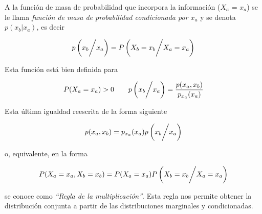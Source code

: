 A la función de masa de probabilidad que incorpora la información ($X_a$ = $x_a$) se le llama \textit{función de masa de probabilidad condicionada por $x_a$}
y se denota $p(x_b|x_a)$, es decir 

\[ p\left( {x_b} \bigg{/} {x_a} \right) = P\left( {X_{b} = x_{b}} \bigg{/} {X_{a} = x_{a}} \right) \]

\newpage

Esta función está bien definida para 

\[ P(X_{a} = x_{a}) > 0 \qquad p\left(x_b \bigg{/} x_a\right) = \frac{p(x_a, x_b)}{p_{x_{a}}(x_a)} \]

Esta última igualdad reescrita de la forma siguiente

\[ p(x_a, x_b) =  p_{x_a}(x_a)p\left( x_b \bigg{/} x_a \right)\]

o, equivalente, en la forma

\[ P(X_a = x_a, X_b = x_b) = P(X_a = x_a)P\left( X_b = x_b \bigg{/} X_a = x_a \right) \]

se conoce como \textit{``Regla de la multiplicación''}. Esta regla nos permite obtener la distribución conjunta
a partir de las distribuciones marginales y condicionadas.

